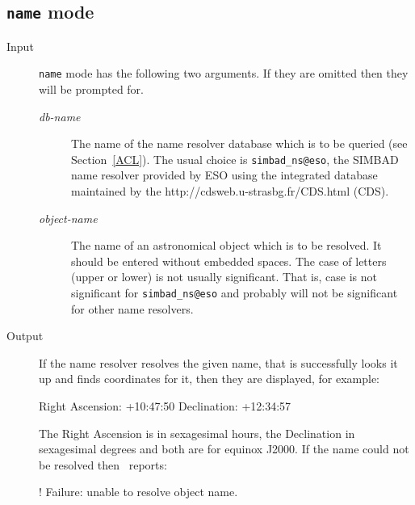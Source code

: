 \documentclass[twoside,11pt]{starlink}
\providecommand{\catremote}{\htmlref{\texttt{catremote}}{CATREMOTE}}
\begin{document}
\subsection{\texttt{name} mode}

\begin{description}

  \item[Input] \texttt{name} mode has the following two arguments.  If they
   are omitted then they will be prompted for.

  \begin{description}

    \item[\textit{db-name}\/] The name of the name resolver database which
     is to be queried (see Section~\ref{ACL}).  The usual choice is \texttt{simbad\_ns@eso}, the SIMBAD name resolver provided by ESO using the
     integrated database maintained by the
     {http://cdsweb.u-strasbg.fr/CDS.html} (CDS).

    \item[\textit{object-name}] The name of an astronomical object which is
     to be resolved.  It should be entered without embedded spaces.  The
     case of letters (upper or lower) is not usually significant.  That
     is, case is not significant for \texttt{simbad\_ns@eso} and probably
     will not be significant for other name resolvers.

  \end{description}

  \item[Output] If the name resolver resolves the given name, that is
   successfully looks it up and finds coordinates for it, then they are
   displayed, for example:

  \begin{terminalv}
Right Ascension: +10:47:50
Declination: +12:34:57
  \end{terminalv}

   The Right Ascension is in sexagesimal hours, the Declination in
   sexagesimal degrees and both are for equinox J2000.  If the name
   could not be resolved then \catremote\ reports:

  \begin{terminalv}
! Failure: unable to resolve object name.
  \end{terminalv}

\end{description}
\end{document}

